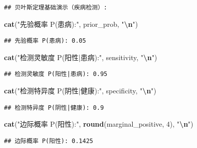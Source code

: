 \documentclass[
  twoside]{book}
\newenvironment{Shaded}{\begin{snugshade}}{\end{snugshade}}
\newcommand{\DecValTok}[1]{\textcolor[rgb]{0.00,0.00,0.81}{#1}}
\newcommand{\FunctionTok}[1]{\textcolor[rgb]{0.13,0.29,0.53}{\textbf{#1}}}
\newcommand{\NormalTok}[1]{#1}
\newcommand{\SpecialCharTok}[1]{\textcolor[rgb]{0.81,0.36,0.00}{\textbf{#1}}}
\newcommand{\StringTok}[1]{\textcolor[rgb]{0.31,0.60,0.02}{#1}}
\begin{document}
\begin{verbatim}
## 贝叶斯定理基础演示（疾病检测）:
\end{verbatim}

\begin{Shaded}
\begin{Highlighting}[]
\FunctionTok{cat}\NormalTok{(}\StringTok{"先验概率 P(患病):"}\NormalTok{, prior\_prob, }\StringTok{"}\SpecialCharTok{\textbackslash{}n}\StringTok{"}\NormalTok{)}
\end{Highlighting}
\end{Shaded}

\begin{verbatim}
## 先验概率 P(患病): 0.05
\end{verbatim}

\begin{Shaded}
\begin{Highlighting}[]
\FunctionTok{cat}\NormalTok{(}\StringTok{"检测灵敏度 P(阳性|患病):"}\NormalTok{, sensitivity, }\StringTok{"}\SpecialCharTok{\textbackslash{}n}\StringTok{"}\NormalTok{)}
\end{Highlighting}
\end{Shaded}

\begin{verbatim}
## 检测灵敏度 P(阳性|患病): 0.95
\end{verbatim}

\begin{Shaded}
\begin{Highlighting}[]
\FunctionTok{cat}\NormalTok{(}\StringTok{"检测特异度 P(阴性|健康):"}\NormalTok{, specificity, }\StringTok{"}\SpecialCharTok{\textbackslash{}n}\StringTok{"}\NormalTok{)}
\end{Highlighting}
\end{Shaded}

\begin{verbatim}
## 检测特异度 P(阴性|健康): 0.9
\end{verbatim}

\begin{Shaded}
\begin{Highlighting}[]
\FunctionTok{cat}\NormalTok{(}\StringTok{"边际概率 P(阳性):"}\NormalTok{, }\FunctionTok{round}\NormalTok{(marginal\_positive, }\DecValTok{4}\NormalTok{), }\StringTok{"}\SpecialCharTok{\textbackslash{}n}\StringTok{"}\NormalTok{)}
\end{Highlighting}
\end{Shaded}

\begin{verbatim}
## 边际概率 P(阳性): 0.1425
\end{verbatim}
\end{document}
